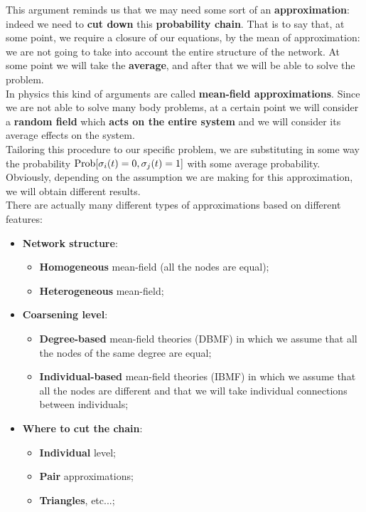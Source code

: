 \documentclass[../main/main.tex]{subfiles}
\begin{document}
This argument reminds us that we may need some sort of an \textbf{approximation}: indeed we need to \textbf{cut down} this \textbf{probability chain}. That is to say that, at some point, we require a closure of our equations, by the mean of approximation: we are not going to take into account the entire structure of the network. At some point we will take the \textbf{average}, and after that we will be able to solve the problem.\\
In physics this kind of arguments are called \textbf{mean-field approximations}. Since we are not able to solve many body problems, at a certain point we will consider a \textbf{random field} which \textbf{acts on the entire system} and we will consider its average effects on the system.\\
Tailoring this procedure to our specific problem, we are substituting in some way the probability \( \text{Prob} \qty[\sigma _i (t) = 0, \sigma _j (t ) =1 ]  \) with some average probability. Obviously, depending on the assumption we are making for this approximation, we will obtain different results.\\
There are actually many different types of approximations based on different features:
\begin{itemize}
\item \textbf{Network structure}:
    \begin{itemize}
    \item \textbf{Homogeneous} mean-field (all the nodes are equal);
    \item \textbf{Heterogeneous} mean-field;
    \end{itemize}
\item \textbf{Coarsening level}:
    \begin{itemize}
    \item \textbf{Degree-based} mean-field theories (DBMF) in which we assume that all the nodes of the same degree are equal;
    \item \textbf{Individual-based} mean-field theories (IBMF) in which we assume that all the nodes are different and that we will take individual connections between individuals;
    \end{itemize}
\item \textbf{Where to cut the chain}:
    \begin{itemize}
    \item \textbf{Individual} level;
    \item \textbf{Pair} approximations;
    \item \textbf{Triangles}, etc...;
    \end{itemize}
\end{itemize}
\end{document}
